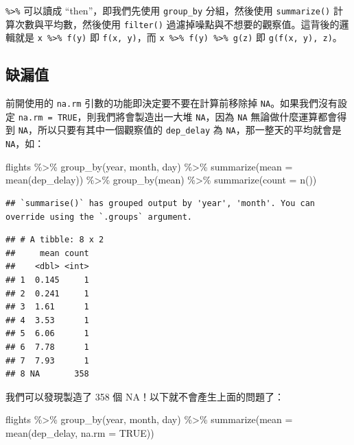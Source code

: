 \documentclass[
]{book}
\newenvironment{Shaded}{\begin{snugshade}}{\end{snugshade}}
\newcommand{\AttributeTok}[1]{\textcolor[rgb]{0.77,0.63,0.00}{#1}}
\newcommand{\ConstantTok}[1]{\textcolor[rgb]{0.00,0.00,0.00}{#1}}
\newcommand{\FunctionTok}[1]{\textcolor[rgb]{0.00,0.00,0.00}{#1}}
\newcommand{\NormalTok}[1]{#1}
\newcommand{\SpecialCharTok}[1]{\textcolor[rgb]{0.00,0.00,0.00}{#1}}
\theoremstyle{definition}
\theoremstyle{remark}
\begin{document}
\texttt{\%\textgreater{}\%} 可以讀成 ``then''，即我們先使用 \texttt{group\_by} 分組，然後使用 \texttt{summarize()} 計算次數與平均數，然後使用 \texttt{filter()} 過濾掉噪點與不想要的觀察值。這背後的邏輯就是 \texttt{x\ \%\textgreater{}\%\ f(y)} 即 \texttt{f(x,\ y)}，而 \texttt{x\ \%\textgreater{}\%\ f(y)\ \%\textgreater{}\%\ g(z)} 即 \texttt{g(f(x,\ y),\ z)}。

\hypertarget{missingvaluesdplyr}{%
\subsection{缺漏值}\label{missingvaluesdplyr}}

前開使用的 \texttt{na.rm} 引數的功能即決定要不要在計算前移除掉 \texttt{NA}。如果我們沒有設定 \texttt{na.rm\ =\ TRUE}，則我們將會製造出一大堆 \texttt{NA}，因為 \texttt{NA} 無論做什麼運算都會得到 \texttt{NA}，所以只要有其中一個觀察值的 \texttt{dep\_delay} 為 \texttt{NA}，那一整天的平均就會是 \texttt{NA}，如：

\begin{Shaded}
\begin{Highlighting}[]
\NormalTok{flights }\SpecialCharTok{\%\textgreater{}\%}
  \FunctionTok{group\_by}\NormalTok{(year, month, day) }\SpecialCharTok{\%\textgreater{}\%}
  \FunctionTok{summarize}\NormalTok{(}\AttributeTok{mean =} \FunctionTok{mean}\NormalTok{(dep\_delay)) }\SpecialCharTok{\%\textgreater{}\%}
  \FunctionTok{group\_by}\NormalTok{(mean) }\SpecialCharTok{\%\textgreater{}\%}
  \FunctionTok{summarize}\NormalTok{(}\AttributeTok{count =} \FunctionTok{n}\NormalTok{())}
\end{Highlighting}
\end{Shaded}

\begin{verbatim}
## `summarise()` has grouped output by 'year', 'month'. You can override using the `.groups` argument.
\end{verbatim}

\begin{verbatim}
## # A tibble: 8 x 2
##     mean count
##    <dbl> <int>
## 1  0.145     1
## 2  0.241     1
## 3  1.61      1
## 4  3.53      1
## 5  6.06      1
## 6  7.78      1
## 7  7.93      1
## 8 NA       358
\end{verbatim}

我們可以發現製造了 358 個 NA！以下就不會產生上面的問題了：

\begin{Shaded}
\begin{Highlighting}[]
\NormalTok{flights }\SpecialCharTok{\%\textgreater{}\%}
  \FunctionTok{group\_by}\NormalTok{(year, month, day) }\SpecialCharTok{\%\textgreater{}\%}
  \FunctionTok{summarize}\NormalTok{(}\AttributeTok{mean =} \FunctionTok{mean}\NormalTok{(dep\_delay, }\AttributeTok{na.rm =} \ConstantTok{TRUE}\NormalTok{))}
\end{Highlighting}
\end{Shaded}
\end{document}
